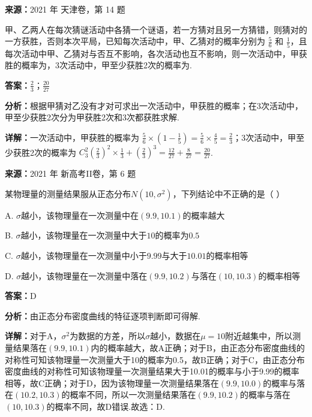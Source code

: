 \begin{question}[points=5]
\textbf{来源：}2021 年 天津卷，第 14 题\par
甲、乙两人在每次猜谜活动中各猜一个谜语，若一方猜对且另一方猜错，则猜对的一方获胜，否则本次平局，已知每次活动中，甲、乙猜对的概率分别为 $\frac{5}{6}$ 和 $\frac{1}{5}$，且每次活动中甲、乙猜对与否互不影响，各次活动也互不影响，则一次活动中，甲获胜的概率为，3次活动中，甲至少获胜2次的概率为.
\begin{solution}
\textbf{答案：}$\frac{2}{3}$；$\frac{20}{27}$

\textbf{分析：}根据甲猜对乙没有才对可求出一次活动中，甲获胜的概率；在3次活动中，甲至少获胜2次分为甲获胜2次和3次都获胜求解.

\textbf{详解：}一次活动中，甲获胜的概率为 $\frac{5}{6} \times \left(1-\frac{1}{5}\right) = \frac{5}{6} \times \frac{4}{5} = \frac{2}{3}$；3次活动中，甲至少获胜2次的概率为 $C_3^2 \left(\frac{2}{3}\right)^2 \times \frac{1}{3} + \left(\frac{2}{3}\right)^3 = \frac{12}{27} + \frac{8}{27} = \frac{20}{27}$.
\end{solution}
\end{question}

\begin{question}[points=5]
\textbf{来源：}2021 年 新高考II卷，第 6 题\par
某物理量的测量结果服从正态分布$N(10,\sigma^2)$，下列结论中不正确的是（ ）
\begin{choices}
  \item A. $\sigma$越小，该物理量在一次测量中在$(9.9,10.1)$的概率越大
  \item B. $\sigma$越小，该物理量在一次测量中大于$10$的概率为$0.5$
  \item C. $\sigma$越小，该物理量在一次测量中小于$9.99$与大于$10.01$的概率相等
  \item D. $\sigma$越小，该物理量在一次测量中落在$(9.9,10.2)$与落在$(10,10.3)$的概率相等
\end{choices}
\begin{solution}
\textbf{答案：}D

\textbf{分析：}由正态分布密度曲线的特征逐项判断即可得解.

\textbf{详解：}对于A，$\sigma^2$为数据的方差，所以$\sigma$越小，数据在$\mu=10$附近越集中，所以测量结果落在$(9.9,10.1)$内的概率越大，故A正确；对于B，由正态分布密度曲线的对称性可知该物理量一次测量大于10的概率为0.5，故B正确；对于C，由正态分布密度曲线的对称性可知该物理量一次测量结果大于10.01的概率与小于9.99的概率相等，故C正确；对于D，因为该物理量一次测量结果落在$(9.9,10.0)$的概率与落在$(10.2,10.3)$的概率不同，所以一次测量结果落在$(9.9,10.2)$的概率与落在$(10,10.3)$的概率不同，故D错误.故选：D.
\end{solution}
\end{question}

